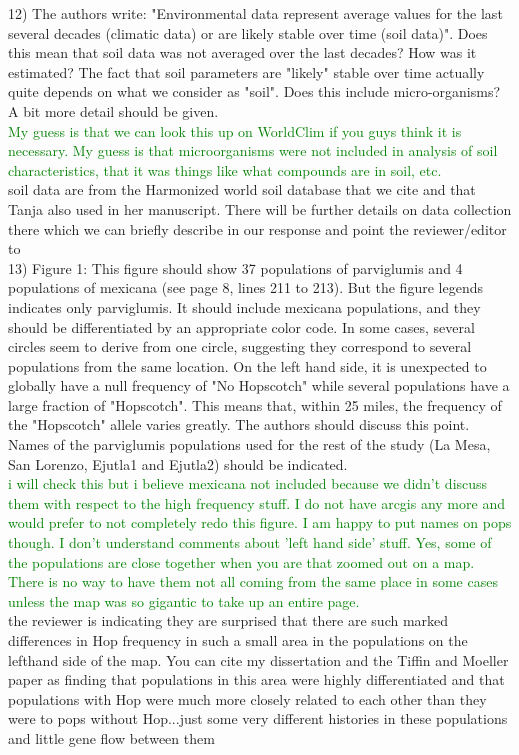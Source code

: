 \documentclass[11pt]{article}
\newcommand{\lev}[1]{\noindent \textcolor{green}{{#1}} \\}
\newcommand{\mbh}[1]{\noindent \textcolor{Dandelion}{{#1}}\\}
\begin{document}
12) The authors write: "Environmental data represent average values for the last several decades (climatic data) or are likely stable over time (soil data)". Does this mean that soil data was not averaged over the last decades? How was it estimated? The fact that soil parameters are "likely" stable over time actually quite depends on what we consider as "soil". Does this include micro-organisms? A bit more detail should be given.\\

\lev{My guess is that we can look this up on WorldClim if you guys think it is necessary. My guess is that microorganisms were not included in analysis of soil characteristics, that it was things like what compounds are in soil, etc.}

\mbh{soil data are from the Harmonized world soil database that we cite and that Tanja also used in her manuscript.  There will be further details on data collection there which we can briefly describe in our response and point the reviewer/editor to}

13) Figure 1: This figure should show 37 populations of parviglumis and 4 populations of mexicana (see page 8, lines 211 to 213). But the figure legends indicates only parviglumis. It should include mexicana populations, and they should be differentiated by an appropriate color code. In some cases, several circles seem to derive from one circle, suggesting they correspond to several populations from the same location. On the left hand side, it is unexpected to globally have a null frequency of "No Hopscotch" while several populations have a large fraction of "Hopscotch". This means that, within 25 miles, the frequency of the "Hopscotch" allele varies greatly. The authors should discuss this point. Names of the parviglumis populations used for the rest of the study (La Mesa, San Lorenzo, Ejutla1 and Ejutla2) should be indicated.\\

\lev{i will check this but i believe mexicana not included because we didn't discuss them with respect to the high frequency stuff. I do not have arcgis any more and would prefer to not completely redo this figure. I am happy to put names on pops though. I don't understand comments about 'left hand side' stuff. Yes, some of the populations are close together when you are that zoomed out on a map. There is no way to have them not all coming from the same place in some cases unless the map was so gigantic to take up an entire page.}

\mbh{the reviewer is indicating they are surprised that there are such marked differences in Hop frequency in such a small area in the populations on the lefthand side of the map.  You can cite my dissertation and the Tiffin and Moeller paper as finding that populations in this area were highly differentiated and that populations with Hop were much more closely related to each other than they were to pops without Hop...just some very different histories in these populations and little gene flow between them}
\end{document}
